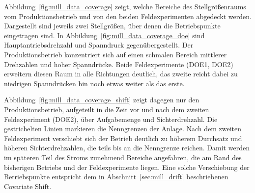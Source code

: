 %
Abbildung~\ref{fig:mill_data_coverage} zeigt, welche Bereiche des Stellgrößenraums vom Produktionsbetrieb und von den beiden Feldexperimenten abgedeckt werden. Dargestellt sind jeweils zwei Stellgrößen, über denen die Betriebspunkte eingetragen sind. In Abbildung~\ref{fig:mill_data_coverage_doe} sind Hauptantriebsdrehzahl und Spanndruck gegenübergestellt. Der Produktionsbetrieb konzentriert sich auf einen schmalen Bereich mittlerer Drehzahlen und hoher Spanndrücke. Beide Feldexperimente (DOE1, DOE2) erweitern diesen Raum in alle Richtungen deutlich, das zweite reicht dabei zu niedrigen Spanndrücken hin noch etwas weiter als das erste. \par
%
Abbildung~\ref{fig:mill_data_coverage_shift} zeigt dagegen nur den Produktionsbetrieb, aufgeteilt in die Zeit vor und nach dem zweiten Feldexperiment (DOE2), über Aufgabemenge und Sichterdrehzahl. Die gestrichelten Linien markieren die Nenngrenzen der Anlage. Nach dem zweiten Feldexperiment verschiebt sich der Betrieb deutlich zu höherem Durchsatz und höheren Sichterdrehzahlen, die teils bis an die Nenngrenze reichen. Damit werden im späteren Teil des Stroms zunehmend Bereiche angefahren, die am Rand des bisherigen Betriebs und der Feldexperimente liegen. Eine solche Verschiebung der Betriebspunkte entspricht dem in Abschnitt~\ref{sec:mill_drift} beschriebenen Covariate Shift. \par
%
